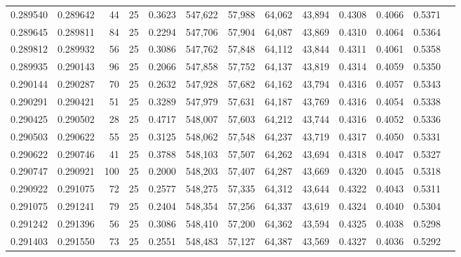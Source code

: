 \begin{tabular}{rrrrrrrrrrrrr}
0.289540 & 0.289642 &    44 &  25 &                                     0.3623 & 547,622 &  57,988 &  64,062 &  43,894 & 0.4308 & 0.4066 & 0.5371 \\
0.289645 & 0.289811 &    84 &  25 &                                     0.2294 & 547,706 &  57,904 &  64,087 &  43,869 & 0.4310 & 0.4064 & 0.5364 \\
0.289812 & 0.289932 &    56 &  25 &                                     0.3086 & 547,762 &  57,848 &  64,112 &  43,844 & 0.4311 & 0.4061 & 0.5358 \\
0.289935 & 0.290143 &    96 &  25 &                                     0.2066 & 547,858 &  57,752 &  64,137 &  43,819 & 0.4314 & 0.4059 & 0.5350 \\
0.290144 & 0.290287 &    70 &  25 &                                     0.2632 & 547,928 &  57,682 &  64,162 &  43,794 & 0.4316 & 0.4057 & 0.5343 \\
0.290291 & 0.290421 &    51 &  25 &                                     0.3289 & 547,979 &  57,631 &  64,187 &  43,769 & 0.4316 & 0.4054 & 0.5338 \\
0.290425 & 0.290502 &    28 &  25 &                                     0.4717 & 548,007 &  57,603 &  64,212 &  43,744 & 0.4316 & 0.4052 & 0.5336 \\
0.290503 & 0.290622 &    55 &  25 &                                     0.3125 & 548,062 &  57,548 &  64,237 &  43,719 & 0.4317 & 0.4050 & 0.5331 \\
0.290622 & 0.290746 &    41 &  25 &                                     0.3788 & 548,103 &  57,507 &  64,262 &  43,694 & 0.4318 & 0.4047 & 0.5327 \\
0.290747 & 0.290921 &   100 &  25 &                                     0.2000 & 548,203 &  57,407 &  64,287 &  43,669 & 0.4320 & 0.4045 & 0.5318 \\
0.290922 & 0.291075 &    72 &  25 &                                     0.2577 & 548,275 &  57,335 &  64,312 &  43,644 & 0.4322 & 0.4043 & 0.5311 \\
0.291075 & 0.291241 &    79 &  25 &                                     0.2404 & 548,354 &  57,256 &  64,337 &  43,619 & 0.4324 & 0.4040 & 0.5304 \\
0.291242 & 0.291396 &    56 &  25 &                                     0.3086 & 548,410 &  57,200 &  64,362 &  43,594 & 0.4325 & 0.4038 & 0.5298 \\
0.291403 & 0.291550 &    73 &  25 &                                     0.2551 & 548,483 &  57,127 &  64,387 &  43,569 & 0.4327 & 0.4036 & 0.5292 \\

\end{tabular}
